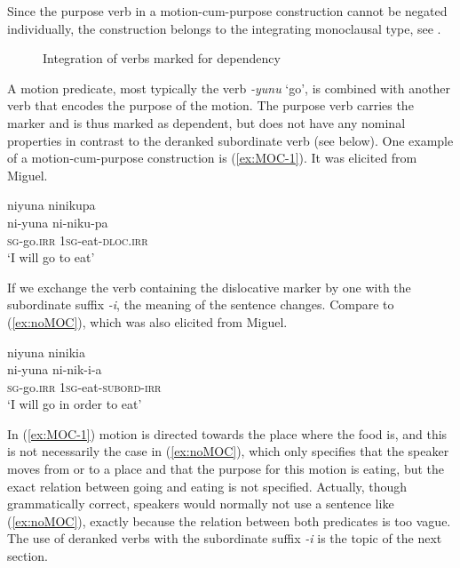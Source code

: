 Since the purpose verb in a motion-cum-purpose construction cannot be negated individually, the construction belongs to the integrating monoclausal type, see .

\begin{figure}
\centering
{}
\caption{Integration of verbs marked for dependency}
\label{fig:IntegrationScaleMCPC}
\end{figure}

A motion predicate, most typically the verb \textit{-yunu} ‘go’, is combined with another verb that encodes the purpose of the motion. The purpose verb carries the  marker and is thus marked as dependent, but does not have any nominal properties in contrast to the deranked subordinate verb (see  below). One example of a motion-cum-purpose construction is (\ref{ex:MOC-1}). It was elicited from Miguel.

\ea\label{ex:MOC-1}
\begingl
\glpreamble niyuna ninikupa\\
\gla ni-yuna ni-niku-pa\\
\textsc{sg}-go.\textsc{irr} 1\textsc{sg}-eat-\textsc{dloc.irr}\\
\glft ‘I will go to eat’
\endgl
\trailingcitation{[mxx-e160811sd.174]}
\xe
{}

If we exchange the verb containing the dislocative marker by one with the subordinate suffix \textit{-i}, the meaning of the sentence changes. Compare to (\ref{ex:noMOC}), which was also elicited from Miguel.

\ea\label{ex:noMOC}
\begingl
\glpreamble niyuna ninikia\\
\gla ni-yuna ni-nik-i-a\\
\textsc{sg}-go.\textsc{irr} 1\textsc{sg}-eat-\textsc{subord}-\textsc{irr}\\
\glft ‘I will go in order to eat’
\endgl
\trailingcitation{[mxx-e160811sd.176-177]}
\xe

In (\ref{ex:MOC-1}) motion is directed towards the place where the food is, and this is not necessarily the case in (\ref{ex:noMOC}), which only specifies that the speaker moves from or to a place and that the purpose for this motion is eating, but the exact relation between going and eating is not specified. Actually, though grammatically correct, speakers would normally not use a sentence like (\ref{ex:noMOC}), exactly because the relation between both predicates is too vague. The use of deranked verbs with the subordinate suffix \textit{-i} is the topic of the next section.

